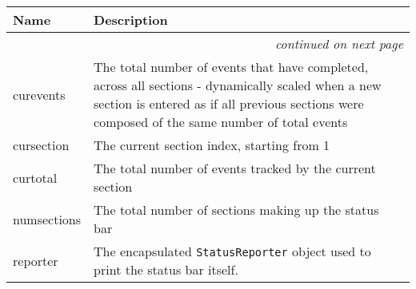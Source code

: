     \vspace{-1cm}
\hspace{\varindent}\begin{longtable}{|p{\varnamewidth}|p{\vardescrwidth}|l}
\cline{1-2}
\cline{1-2} \centering \textbf{Name} & \centering \textbf{Description}& \\
\cline{1-2}
\endhead\cline{1-2}\multicolumn{3}{r}{\small\textit{continued on next page}}\\\endfoot\cline{1-2}
\endlastfoot\raggedright c\-u\-r\-e\-v\-e\-n\-t\-s\- & The total number of events that have completed, across all 
          sections - dynamically scaled when a new section is entered as if
          all previous sections were composed of the same number of total 
          events&\\
\cline{1-2}
\raggedright c\-u\-r\-s\-e\-c\-t\-i\-o\-n\- & The current section index, starting from 1&\\
\cline{1-2}
\raggedright c\-u\-r\-t\-o\-t\-a\-l\- & The total number of events tracked by the current section&\\
\cline{1-2}
\raggedright n\-u\-m\-s\-e\-c\-t\-i\-o\-n\-s\- & The total number of sections making up the status bar&\\
\cline{1-2}
\raggedright r\-e\-p\-o\-r\-t\-e\-r\- & The encapsulated \texttt{StatusReporter} object used to print the
          status bar itself.&\\
\cline{1-2}
\end{longtable}

